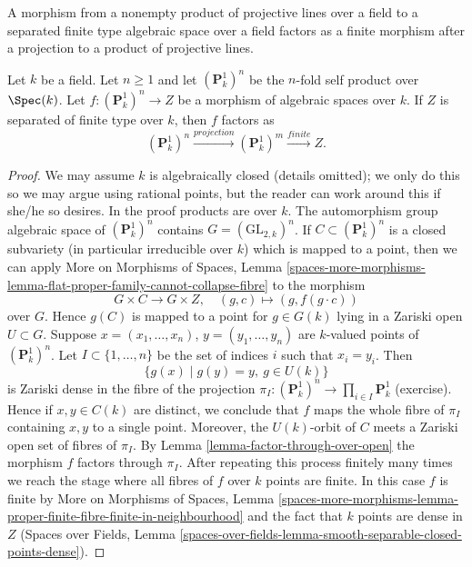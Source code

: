 \begin{lemma}
\label{lemma-quotient-power-P1}
\begin{slogan}
A morphism from a nonempty product of projective lines over a field to
a separated finite type algebraic space over a field factors as a
finite morphism after a projection to a product of projective lines.
\end{slogan}
Let $k$ be a field. Let $n \geq 1$ and let $(\mathbf{P}^1_k)^n$
be the $n$-fold self product over $\Spec(k)$. Let
$f : (\mathbf{P}^1_k)^n \to Z$ be a morphism of algebraic spaces over $k$.
If $Z$ is separated of finite type over $k$, then $f$ factors as
$$
(\mathbf{P}^1_k)^n \xrightarrow{projection}
(\mathbf{P}^1_k)^m \xrightarrow{finite} Z.
$$
\end{lemma}

\begin{proof}
We may assume $k$ is algebraically closed (details omitted); we only
do this so we may argue using rational points, but the reader can work
around this if she/he so desires. In the proof products are over $k$.
The automorphism group algebraic space of $(\mathbf{P}^1_k)^n$ contains
$G = (\text{GL}_{2, k})^n$. If $C \subset (\mathbf{P}^1_k)^n$ is a
closed subvariety (in particular irreducible over $k$) which is mapped
to a point, then we can apply
More on Morphisms of Spaces,
Lemma \ref{spaces-more-morphisms-lemma-flat-proper-family-cannot-collapse-fibre}
to the morphism
$$
G \times C \to G \times Z,\quad (g, c) \mapsto (g, f(g \cdot c))
$$
over $G$. Hence $g(C)$ is mapped to a point for $g \in G(k)$
lying in a Zariski open $U \subset G$. Suppose
$x = (x_1, \ldots, x_n)$, $y = (y_1, \ldots, y_n)$
are $k$-valued points of $(\mathbf{P}^1_k)^n$. Let
$I \subset \{1, \ldots, n\}$ be the set of indices $i$
such that $x_i = y_i$. Then
$$
\{g(x) \mid g(y) = y,\ g \in U(k)\}
$$
is Zariski dense in the fibre of the projection
$\pi_I : (\mathbf{P}^1_k)^n \to \prod_{i \in I} \mathbf{P}^1_k$
(exercise). Hence if $x, y \in C(k)$ are distinct, we conclude
that $f$ maps the whole fibre of $\pi_I$ containing $x, y$ to a
single point. Moreover, the $U(k)$-orbit of $C$ meets a Zariski
open set of fibres of $\pi_I$. By Lemma \ref{lemma-factor-through-over-open}
the morphism $f$ factors through $\pi_I$.
After repeating this process finitely many times we reach
the stage where all fibres of $f$ over $k$ points are finite.
In this case $f$ is finite by
More on Morphisms of Spaces, Lemma
\ref{spaces-more-morphisms-lemma-proper-finite-fibre-finite-in-neighbourhood}
and the fact that $k$ points are dense in $Z$
(Spaces over Fields, Lemma
\ref{spaces-over-fields-lemma-smooth-separable-closed-points-dense}).
\end{proof}


